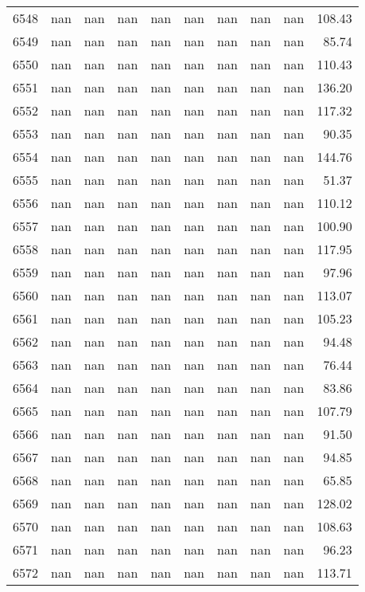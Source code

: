 \begin{tabular}{lrrrrrrrrr}
6548 & nan & nan & nan & nan & nan & nan & nan & nan & 108.43 \\
6549 & nan & nan & nan & nan & nan & nan & nan & nan & 85.74 \\
6550 & nan & nan & nan & nan & nan & nan & nan & nan & 110.43 \\
6551 & nan & nan & nan & nan & nan & nan & nan & nan & 136.20 \\
6552 & nan & nan & nan & nan & nan & nan & nan & nan & 117.32 \\
6553 & nan & nan & nan & nan & nan & nan & nan & nan & 90.35 \\
6554 & nan & nan & nan & nan & nan & nan & nan & nan & 144.76 \\
6555 & nan & nan & nan & nan & nan & nan & nan & nan & 51.37 \\
6556 & nan & nan & nan & nan & nan & nan & nan & nan & 110.12 \\
6557 & nan & nan & nan & nan & nan & nan & nan & nan & 100.90 \\
6558 & nan & nan & nan & nan & nan & nan & nan & nan & 117.95 \\
6559 & nan & nan & nan & nan & nan & nan & nan & nan & 97.96 \\
6560 & nan & nan & nan & nan & nan & nan & nan & nan & 113.07 \\
6561 & nan & nan & nan & nan & nan & nan & nan & nan & 105.23 \\
6562 & nan & nan & nan & nan & nan & nan & nan & nan & 94.48 \\
6563 & nan & nan & nan & nan & nan & nan & nan & nan & 76.44 \\
6564 & nan & nan & nan & nan & nan & nan & nan & nan & 83.86 \\
6565 & nan & nan & nan & nan & nan & nan & nan & nan & 107.79 \\
6566 & nan & nan & nan & nan & nan & nan & nan & nan & 91.50 \\
6567 & nan & nan & nan & nan & nan & nan & nan & nan & 94.85 \\
6568 & nan & nan & nan & nan & nan & nan & nan & nan & 65.85 \\
6569 & nan & nan & nan & nan & nan & nan & nan & nan & 128.02 \\
6570 & nan & nan & nan & nan & nan & nan & nan & nan & 108.63 \\
6571 & nan & nan & nan & nan & nan & nan & nan & nan & 96.23 \\
6572 & nan & nan & nan & nan & nan & nan & nan & nan & 113.71 \\

\end{tabular}
